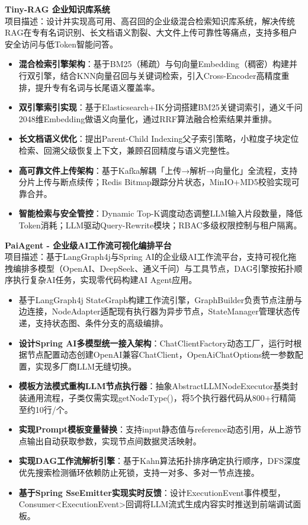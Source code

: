 \documentclass[11pt]{article}
\newlength{\interProjectSpacing}
\newcommand{\projectsep}{\vspace{\interProjectSpacing}}
\newlength{\intraProjectTitleSep}
\newcommand{\titlebreak}{\\[\intraProjectTitleSep]}
\newlength{\intraProjectListTopSep}
\begin{document}
\textbf{Tiny-RAG 企业知识库系统} \hfill  \titlebreak
项目描述：设计并实现高可用、高召回的企业级混合检索知识库系统，解决传统RAG在专有名词识别、长文档语义割裂、大文件上传可靠性等痛点，支持多租户安全访问与低Token智能问答。
\begin{itemize}[nosep, topsep=\intraProjectListTopSep]
    \item \textbf{混合检索引擎架构}：基于BM25（稀疏）与句向量Embedding（稠密）构建并行双引擎，结合KNN向量召回与关键词检索，引入Cross-Encoder高精度重排，提升专有名词与长尾语义覆盖率。
    \item \textbf{双引擎索引实现}：基于Elasticsearch+IK分词搭建BM25关键词索引，通义千问2048维Embedding做语义向量化，通过RRF算法融合检索结果并重排。
    \item \textbf{长文档语义优化}：提出Parent-Child Indexing父子索引策略，小粒度子块定位检索、回溯父级恢复上下文，兼顾召回精度与语义完整性。
    \item \textbf{高可靠文件上传架构}：基于Kafka解耦「上传→解析→向量化」全流程，支持分片上传与断点续传；Redis Bitmap跟踪分片状态，MinIO+MD5校验实现可靠合并。
    \item \textbf{智能检索与安全管控}：Dynamic Top-K调度动态调整LLM输入片段数量，降低Token消耗；LLM驱动Query-Rewrite模块；RBAC多级权限控制与租户隔离。
\end{itemize}

\projectsep
\vspace{0.8em}
\textbf{PaiAgent - 企业级AI工作流可视化编排平台} \hfill  \titlebreak
项目描述：基于LangGraph4j与Spring AI的企业级AI工作流平台，支持可视化拖拽编排多模型（OpenAI、DeepSeek、通义千问）与工具节点，DAG引擎按拓扑顺序执行复杂AI任务，实现零代码构建AI Agent应用。
\begin{itemize}[nosep, topsep=\intraProjectListTopSep]
    \item 基于LangGraph4j StateGraph构建工作流引擎，GraphBuilder负责节点注册与边连接，NodeAdapter适配现有执行器为异步节点，StateManager管理状态传递，支持状态图、条件分支的高级编排。
    \item \textbf{设计Spring AI多模型统一接入架构}：ChatClientFactory动态工厂，运行时根据节点配置动态创建OpenAI兼容ChatClient，OpenAiChatOptions统一参数配置，实现多厂商LLM无缝切换。
    \item \textbf{模板方法模式重构LLM节点执行器}：抽象AbstractLLMNodeExecutor基类封装通用流程，子类仅需实现getNodeType()，将5个执行器代码从800+行精简至约10行/个。
    \item \textbf{实现Prompt模板变量替换}：支持input静态值与reference动态引用，从上游节点输出自动获取参数，实现节点间数据灵活映射。
    \item \textbf{实现DAG工作流解析引擎}：基于Kahn算法拓扑排序确定执行顺序，DFS深度优先搜索检测循环依赖防止死锁，支持一对多、多对一节点连接。
    \item \textbf{基于Spring SseEmitter实现实时反馈}：设计ExecutionEvent事件模型，Consumer<ExecutionEvent>回调将LLM流式生成内容实时推送到前端调试面板。
\end{itemize}
\end{document}
